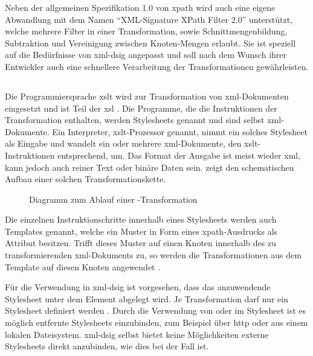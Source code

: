 Neben der allgemeinen Spezifikation 1.0 von \gls{xpath} \cite{xpath:w3c} wird auch eine eigene Abwandlung mit dem Namen "`XML-Signature XPath Filter 2.0"'
\cite{xml-dsig-filter:w3c} unterstützt, welche mehrere Filter in einer Transformation, sowie Schnittmengenbildung, Subtraktion und Vereinigung zwischen
Knoten-Mengen erlaubt. Sie ist speziell auf die Bedürfnisse von \gls{xml-dsig} angepasst und soll nach dem Wunsch ihrer Entwickler auch eine schnellere
Verarbeitung der Transformationen gewährleisten.



\subsection{}
\label{sec:XML-DSig:Transformationen:XSLT}
Die Programmiersprache \gls{xslt} wird zur Transformation von \gls{xml}-Dokumenten eingesetzt und ist Teil der \gls{xsl} \cite{xml:oreilly}. Die Programme, die
die Instruktionen der Transformation enthalten, werden Stylesheets genannt und sind selbst \gls{xml}-Dokumente. Ein Interpreter, \gls{xslt}-Prozessor genannt,
nimmt ein solches Stylesheet als Eingabe und wandelt ein oder mehrere \gls{xml}-Dokumente, den \gls{xslt}-Instruktionen entsprechend, um. Das Format der Ausgabe ist
meist wieder \gls{xml}, kann jedoch auch reiner Text oder binäre Daten sein.  zeigt den schematischen Aufbau einer solchen
Transformationskette.

\begin{figure}
    \centering
    
    \caption{Diagramm zum Ablauf einer \texorpdfstring{\protect{}}{XSLT}-Transformation}
    \label{fig:xslt-processing}
\end{figure}

Die einzelnen Instruktionschritte innerhalb eines Stylesheets werden auch Templates genannt, welche ein Muster in Form eines \gls{xpath}-Ausdrucks als Attribut besitzen. 
Trifft dieses Muster auf einen Knoten innerhalb des zu transformierenden \gls{xml}-Dokuments zu, so werden die Transformationen  aus dem Template auf diesen Knoten 
angewendet \cite{xslt:w3c,xml:oreilly}.

Für die Verwendung in \gls{xml-dsig} ist vorgesehen, dass das anzuwendende Stylesheet unter dem Element  abgelegt wird.
Je Transformation darf nur ein Stylesheet definiert werden \cite{xml-dsig:w3c}. Durch die Verwendung von  oder  im
Stylesheet ist es möglich entfernte Stylesheets einzubinden, zum Beispiel über \gls{http} oder aus einem lokalen Dateisystem. \gls{xml-dsig} selbst bietet keine
Möglichkeiten externe Stylesheets direkt anzubinden, wie dies bei  der Fall ist. 

